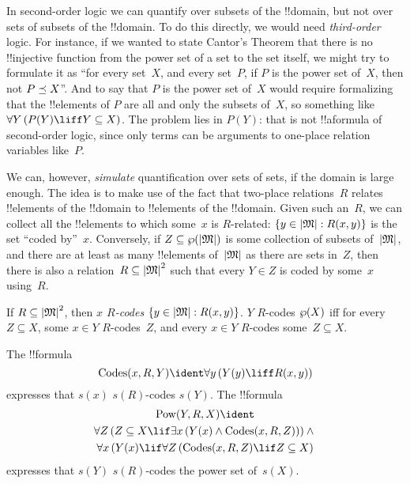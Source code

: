 \documentclass[../../../include/open-logic-section]{subfiles}
\begin{document}


\begin{explain}
In second-order logic we can quantify over subsets of the !!{domain},
but not over sets of subsets of the !!{domain}. To do this directly,
we would need \emph{third-order} logic.  For instance, if we wanted to
state Cantor's Theorem that there is no !!{injective} function from
the power set of a set to the set itself, we might try to formulate it
as ``for every set~$X$, and every set~$P$, if $P$ is the power set
of~$X$, then not $P \preceq X$''. And to say that $P$ is the power set
of~$X$ would require formalizing that the !!{element}s of $P$ are all
and only the subsets of~$X$, so something like $\lforall[Y][(P(Y)
  \liff Y \subseteq X)]$. The problem lies in $P(Y)$: that is not
!!a{formula} of second-order logic, since only terms can be arguments
to one-place relation variables like~$P$.

We can, however, \emph{simulate} quantification over sets of sets, if
the domain is large enough.  The idea is to make use of the fact that
two-place relations~$R$ relates !!{element}s of the !!{domain} to
!!{element}s of the !!{domain}. Given such an~$R$, we can collect all
the !!{element}s to which some~$x$ is $R$-related: $\Setabs{y \in
  \Domain{M}}{R(x,y)}$ is the set ``coded by''~$x$.  Conversely, if
$Z \subseteq \Pow{\Domain{M}}$ is some collection of subsets
of~$\Domain{M}$, and there are at least as many !!{element}s
of~$\Domain{M}$ as there are sets in~$Z$, then there is also a
relation~$R \subseteq \Domain{M}^2$ such that every $Y \in Z$ is coded
by some~$x$ using~$R$.
\end{explain}

\begin{defn}
If $R \subseteq \Domain{M}^2$, then \emph{$x$ $R$-codes} $\Setabs{y
  \in \Domain{M}}{R(x, y)}$. $Y$ $R$-codes $\wp(X)$ iff for every $Z
\subseteq X$, some $x \in Y$ $R$-codes~$Z$, and every $x \in Y$
$R$-codes some~$Z \subseteq X$.
\end{defn}

\begin{prop}
  The !!{formula}
  \[
  \fn{Codes}(x, R, Y) \ident \lforall[y][(Y(y) \liff
    R(x, y))]
  \]
  expresses that $s(x)$ $s(R)$-codes $s(Y)$.  The
!!{formula} 
\begin{multline*}
  \fn{Pow}(Y, R, X) \ident \\
  \lforall[Z][(Z \subseteq X \lif \lexists[x][(Y(x) \land
    \fn{Codes}(x, R, Z))])] \land {} \\ \lforall[x][(Y(x) \lif
  \lforall[Z][(\fn{Codes}(x, R, Z) \lif Z \subseteq X)]]
\end{multline*}
expresses that $s(Y)$ $s(R)$-codes the power set of~$s(X)$.
\end{prop}
\end{document}
